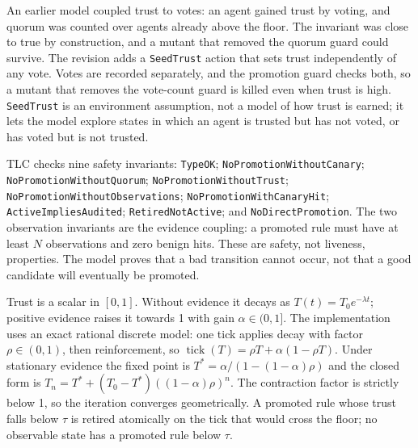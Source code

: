 \documentclass[preprint,11pt]{elsarticle}
\begin{document}
An earlier model coupled trust to votes: an agent gained trust by
voting, and quorum was counted over agents already above the floor. The
invariant was close to true by construction, and a mutant that removed
the quorum guard could survive. The revision adds a \texttt{Seed\allowbreak{}Trust}
action that sets trust independently of any vote. Votes are recorded
separately, and the promotion guard checks both, so a mutant that
removes the vote-count guard is killed even when trust is high.
\texttt{Seed\allowbreak{}Trust} is an environment assumption, not a model of how
trust is earned; it lets the model explore states in which an agent is
trusted but has not voted, or has voted but is not trusted.

TLC checks nine safety invariants: \texttt{Type\allowbreak{}OK};
\texttt{No\allowbreak{}Promotion\allowbreak{}Without\allowbreak{}Canary}; \texttt{No\allowbreak{}Promotion\allowbreak{}Without\allowbreak{}Quorum};
\texttt{No\allowbreak{}Promotion\allowbreak{}Without\allowbreak{}Trust};
\texttt{No\allowbreak{}Promotion\allowbreak{}Without\allowbreak{}Observations};
\texttt{No\allowbreak{}Promotion\allowbreak{}With\allowbreak{}Canary\allowbreak{}Hit}; \texttt{Active\allowbreak{}Implies\allowbreak{}Audited};
\texttt{Retired\allowbreak{}Not\allowbreak{}Active}; and \texttt{No\allowbreak{}Direct\allowbreak{}Promotion}. The two
observation invariants are the evidence coupling: a promoted rule must
have at least \(N\) observations and zero benign hits. These are safety,
not liveness, properties. The model proves that a bad transition cannot
occur, not that a good candidate will eventually be promoted.

Trust is a scalar in \([0,1]\). Without evidence it decays as
\(T(t) = T_0 e^{-\lambda t}\); positive evidence raises it towards 1
with gain \(\alpha \in (0,1]\). The implementation uses an exact
rational discrete model: one tick applies decay with factor
\(\rho \in (0,1)\), then reinforcement, so
\(\operatorname{tick}(T) = \rho T + \alpha(1-\rho T)\). Under stationary
evidence the fixed point is \(T^\ast = \alpha / (1-(1-\alpha)\rho)\) and
the closed form is \(T_n = T^\ast + (T_0 - T^\ast)((1-\alpha)\rho)^n\).
The contraction factor is strictly below 1, so the iteration converges
geometrically. A promoted rule whose trust falls below \(\tau\) is
retired atomically on the tick that would cross the floor; no observable
state has a promoted rule below \(\tau\).
\end{document}
